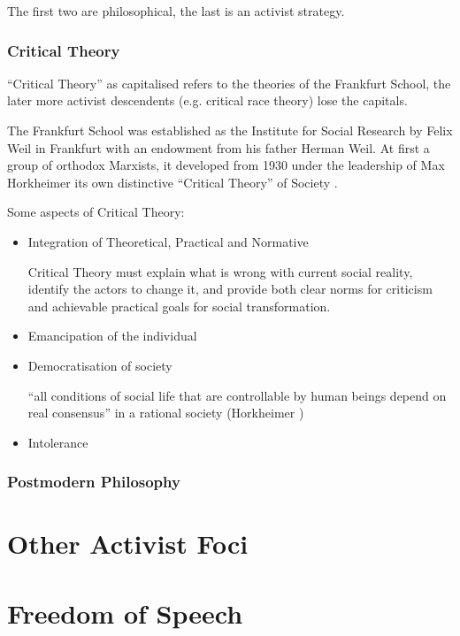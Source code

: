 \documentclass[10pt,titlepage]{book}
\begin{document}
The first two are philosophical, the last is an activist strategy.

\subsubsection{Critical Theory}

``Critical Theory'' as capitalised refers to the theories of the Frankfurt School, the later more activist descendents (e.g. critical race theory) lose the capitals.

The Frankfurt School was established as the Institute for Social Research by Felix Weil in Frankfurt with an endowment from his father Herman Weil.
At first a group of orthodox Marxists, it developed from 1930 under the leadership of Max Horkheimer its own distinctive ``Critical Theory'' of Society \cite{horkheimer-trad,horkheimer-crit}.


Some aspects of Critical Theory:

\begin{itemize}
\item Integration of Theoretical, Practical and Normative

  Critical Theory must explain what is wrong with current social reality, identify the actors to change it, and provide both clear norms for criticism and achievable practical goals for social transformation.
  
\item Emancipation of the individual
  
\item Democratisation of society

  “all conditions of social life that are controllable by human beings depend on real consensus” in a rational society (Horkheimer \cite{horkheimer-crit})

  \item Intolerance
\end{itemize}

\subsubsection{Postmodern Philosophy}

\section{Other Activist Foci}

\section{Freedom of Speech}
\end{document}
